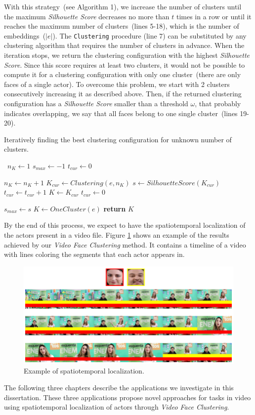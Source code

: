 With this strategy~(see Algorithm 1), we increase the number of clusters until the maximum \emph{Silhouette Score} decreases no more than $t$ times in a row or until it reaches the maximum number of clusters~(lines 5-18), which is the number of embeddings~($|e|$).
The \texttt{Clustering} procedure (line 7)
can be substituted by any clustering algorithm that requires the number of clusters in advance.
When the iteration stops, we return the clustering configuration with the highest \emph{Silhouette Score}.
Since this score requires at least two clusters, it would not be possible to compute it for a clustering configuration with only one cluster~(there are only faces of a single actor).
To overcome this problem, we start with 2 clusters consecutively increasing it as described above. Then, if the returned clustering configuration has a \emph{Silhouette Score} smaller than a threshold $\omega$, that probably indicates overlapping, we say that all faces belong to one single cluster~(lines 19-20). 

\begin{algorithm}
\small
\caption{Iteratively finding the best clustering configuration for unknown number of clusters.}\label{clustering_alg}
\begin{algorithmic}[1]
\
\State $n_K\gets 1$
\State $s_{max}\gets -1$
\State $t_{cur}\gets 0$ 

    \State $n_K\gets n_K+1$
    \State $K_{cur}\gets Clustering(e, n_K)$
    \State $s \gets SilhouetteScore(K_{cur})$
        \State $t_{cur}\gets t_{cur}+1$
    \Else
        \State $K\gets K_{cur}$
        \State $t_{cur}\gets 0$
        
            \State $s_{max} \gets s$
        \EndIf
    \EndIf
\EndWhile
{}
    \State $K\gets OneCluster(e)$
\EndIf
\State \textbf{return} $K$
\EndProcedure
\end{algorithmic}
\end{algorithm}


By the end of this process, we expect to have the spatiotemporal localization of the actors present in a video file.
Figure \ref{fig:timeline} shows an example of the results achieved by our \emph{Video Face Clustering} method. It contains a timeline of a video with lines coloring the segments that each actor appears in.

\begin{figure}[!ht]
    \centering
    \includegraphics[width=0.85\linewidth]{img/face_clustering/example_localization.png}
    \caption{Example of spatiotemporal localization.}
    \label{fig:timeline}
\end{figure}

The following three chapters describe the applications we investigate in this dissertation. 
These three applications propose novel approaches for tasks in video using spatiotemporal localization of actors through \emph{Video Face Clustering}.

